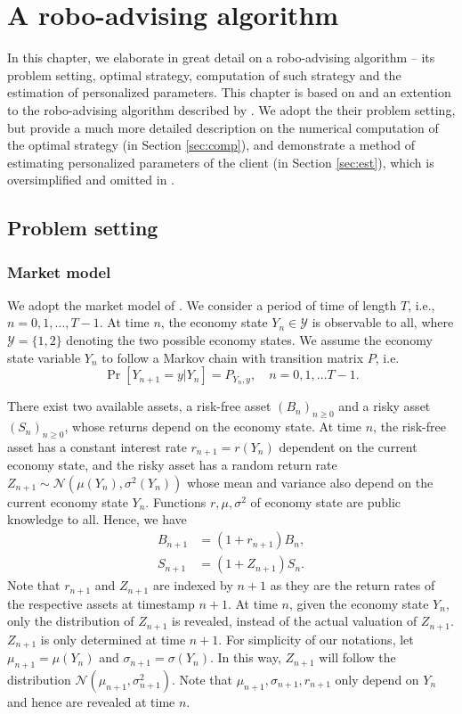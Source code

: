 \chapter{A robo-advising algorithm}

In this chapter, we elaborate in great detail on a robo-advising algorithm -- its problem setting, optimal strategy, computation of such strategy and the estimation of personalized parameters. This chapter is based on and an extention to the robo-advising algorithm described by . We adopt the their problem setting, but provide a much more detailed description on the numerical computation of the optimal strategy (in Section \ref{sec:comp}), and demonstrate a method of estimating personalized parameters of the client (in Section \ref{sec:est}), which is oversimplified and omitted in . 

\section{Problem setting}\label{sec:setting}
\subsection{Market model}\label{sec:market_model}
We adopt the market model of . We consider a period of time of length $T$, i.e., $n=0,1,\ldots,T-1$. At time $n$, the economy state $Y_n\in\mathcal{Y}$ is observable to all, where $\mathcal{Y}=\{1,2\}$ denoting the two possible economy states. We assume the economy state variable $Y_n$ to follow a Markov chain with transition matrix $P$, i.e. $$\Pr[Y_{n+1}=y|Y_n]=P_{Y_n, y},\quad n=0,1,\ldots T-1.$$

There exist two available assets, a risk-free asset $(B_n)_{n\geq 0}$ and a risky asset $(S_n)_{n\geq 0}$, whose returns depend on the economy state. At time $n$, the risk-free asset has a constant interest rate $r_{n+1}=r(Y_n)$ dependent on the current economy state, and the risky asset has a random return rate $Z_{n+1}\sim\mathcal{N}(\mu(Y_n),\sigma^2(Y_n))$ whose mean and variance also depend on the current economy state $Y_n$. Functions $r,\mu,\sigma^2$ of economy state are public knowledge to all. Hence, we have \begin{equation}
    \begin{aligned}
        B_{n+1}&=(1+r_{n+1})B_n,\\
        S_{n+1}&=(1+Z_{n+1})S_n.
    \end{aligned}
\end{equation} Note that $r_{n+1}$ and $Z_{n+1}$ are indexed by $n+1$ as they are the return rates of the respective assets at timestamp $n+1$. At time $n$, given the economy state $Y_n$, only the distribution of $Z_{n+1}$ is revealed, instead of the actual valuation of  $Z_{n+1}$. $Z_{n+1}$ is only determined at time $n+1$. For simplicity of our notations, let $\mu_{n+1}=\mu(Y_n)$ and $\sigma_{n+1}=\sigma(Y_n)$. In this way, $Z_{n+1}$ will follow the distribution $\mathcal{N}(\mu_{n+1},\sigma^2_{n+1})$. Note that $\mu_{n+1},\sigma_{n+1},r_{n+1}$ only depend on $Y_n$ and hence are revealed at time $n$.

